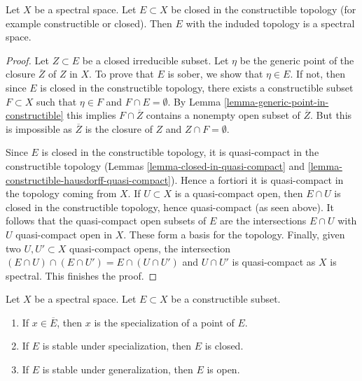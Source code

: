 \begin{lemma}
\label{lemma-spectral-sub}
Let $X$ be a spectral space. Let $E \subset X$ be closed in the constructible
topology (for example constructible or closed). Then $E$ with the induded
topology is a spectral space.
\end{lemma}

\begin{proof}
Let $Z \subset E$ be a closed irreducible subset. Let $\eta$ be the generic
point of the closure $\overline{Z}$ of $Z$ in $X$. To prove that $E$
is sober, we show that $\eta \in E$. If not, then since $E$ is closed
in the constructible topology, there exists a constructible subset
$F \subset X$ such that $\eta \in F$ and $F \cap E = \emptyset$.
By Lemma \ref{lemma-generic-point-in-constructible} this implies
$F \cap \overline{Z}$ contains a nonempty open subset of $\overline{Z}$.
But this is impossible as $\overline{Z}$ is the closure of $Z$ and
$Z \cap F = \emptyset$.

\medskip\noindent
Since $E$ is closed in the constructible topology, it is quasi-compact
in the constructible topology
(Lemmas \ref{lemma-closed-in-quasi-compact} and
\ref{lemma-constructible-hausdorff-quasi-compact}). Hence a fortiori it is
quasi-compact in the topology coming from $X$. If $U \subset X$
is a quasi-compact open, then $E \cap U$ is closed in the constructible
topology, hence quasi-compact (as seen above). It follows that the
quasi-compact open subsets of $E$ are the intersections $E \cap U$
with $U$ quasi-compact open in $X$. These form a basis for the topology.
Finally, given two $U, U' \subset X$ quasi-compact opens, the intersection
$(E \cap U) \cap (E \cap U') = E \cap (U \cap U')$ and $U \cap U'$
is quasi-compact as $X$ is spectral. This finishes the proof.
\end{proof}

\begin{lemma}
\label{lemma-constructible-stable-specialization-closed}
Let $X$ be a spectral space. Let $E \subset X$ be a constructible subset.
\begin{enumerate}
\item If $x \in \overline{E}$, then $x$ is the specialization of a point of
$E$.
\item If $E$ is stable under specialization, then $E$ is closed.
\item If $E$ is stable under generalization, then $E$ is open.
\end{enumerate}
\end{lemma}

